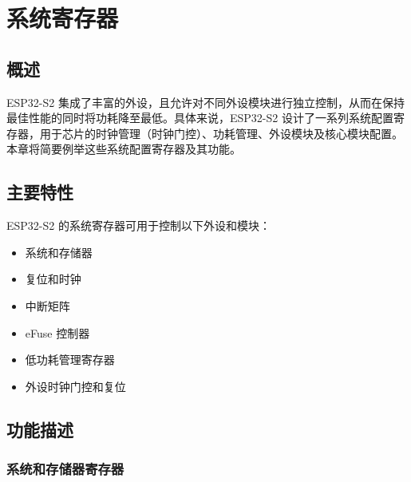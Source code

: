 \documentclass[main\_\_CN.tex]{subfiles}
\begin{document}
\setchineseformatting

\ifglobal
\else
    \listoftodos
    {\let\clearpage\relax \listofdonetodos}
    \tableofcontents
\fi




\hypertarget{sysreg}{}
\chapter{系统寄存器}
\label{mod:sysreg}


\section{概述}

ESP32-S2 集成了丰富的外设，且允许对不同外设模块进行独立控制，从而在保持最佳性能的同时将功耗降至最低。具体来说，ESP32-S2 设计了一系列系统配置寄存器，用于芯片的时钟管理（时钟门控）、功耗管理、外设模块及核心模块配置。本章将简要例举这些系统配置寄存器及其功能。

\section{主要特性}

ESP32-S2 的系统寄存器可用于控制以下外设和模块：

\begin{itemize}
    \item 系统和存储器
    \item 复位和时钟
    \item 中断矩阵
    \item eFuse 控制器
    \item 低功耗管理寄存器
    \item 外设时钟门控和复位
\end{itemize}


\section{功能描述}

\subsection{系统和存储器寄存器}
\end{document}
